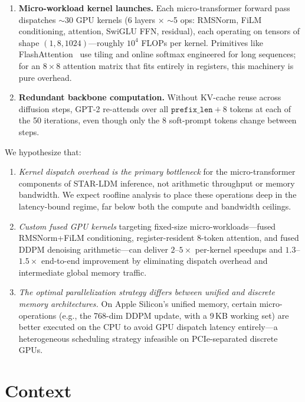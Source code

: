 \documentclass[sigconf,authordraft]{acmart}
\begin{document}
\begin{enumerate}
    \item \textbf{Micro-workload kernel launches.} Each micro-transformer forward pass dispatches ${\sim}$30 GPU kernels (6 layers $\times$ ${\sim}$5 ops: RMSNorm, FiLM conditioning, attention, SwiGLU FFN, residual), each operating on tensors of shape $(1, 8, 1024)$---roughly $10^4$ FLOPs per kernel. Primitives like FlashAttention~\cite{dao2024flashattention2} use tiling and online softmax engineered for long sequences; for an $8\times 8$ attention matrix that fits entirely in registers, this machinery is pure overhead.

    \item \textbf{Redundant backbone computation.} Without KV-cache reuse across diffusion steps, GPT-2 re-attends over all $\texttt{prefix\_len} + 8$ tokens at each of the 50 iterations, even though only the 8 soft-prompt tokens change between steps.
\end{enumerate}

\noindent We hypothesize that:

\begin{enumerate}[label=\textbf{H\arabic*.}]
    \item \textit{Kernel dispatch overhead is the primary bottleneck} for the micro-transformer components of STAR-LDM inference, not arithmetic throughput or memory bandwidth. We expect roofline analysis to place these operations deep in the latency-bound regime, far below both the compute and bandwidth ceilings.

    \item \textit{Custom fused GPU kernels} targeting fixed-size micro-workloads---fused RMSNorm+FiLM conditioning, register-resident 8-token attention, and fused DDPM denoising arithmetic---can deliver $2$--$5\times$ per-kernel speedups and $1.3$--$1.5\times$ end-to-end improvement by eliminating dispatch overhead and intermediate global memory traffic.

    \item \textit{The optimal parallelization strategy differs between unified and discrete memory architectures.} On Apple Silicon's unified memory, certain micro-operations (e.g., the 768-dim DDPM update, with a 9\,KB working set) are better executed on the CPU to avoid GPU dispatch latency entirely---a heterogeneous scheduling strategy infeasible on PCIe-separated discrete GPUs.
\end{enumerate}

\section{Context}
\end{document}
